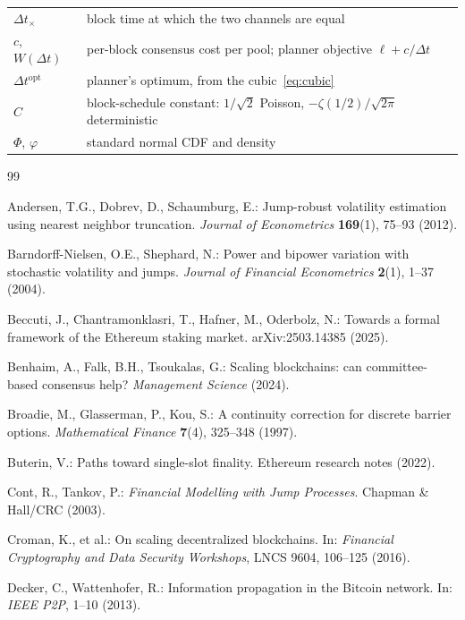 \documentclass[11pt]{article}
\theoremstyle{definition}
\theoremstyle{remark}
\newcommand{\dt}{\Delta t}
\newcommand{\1}{\mathbf{1}}
\begin{document}
\begin{center}
\begin{tabular}{ll}
$\dt_\times$ & block time at which the two channels are equal \\
$c$, $W(\dt)$ & per-block consensus cost per pool; planner objective $\ell + c/\dt$ \\
$\dt^{\mathrm{opt}}$ & planner's optimum, from the cubic~\eqref{eq:cubic} \\
$C$ & block-schedule constant: $1/\sqrt2$ Poisson, $-\zeta(1/2)/\sqrt{2\pi}$ deterministic \\
$\Phi$, $\varphi$ & standard normal CDF and density \\
\bottomrule
\end{tabular}
\end{center}

\begin{thebibliography}{99}

Andersen, T.G., Dobrev, D., Schaumburg, E.:
Jump-robust volatility estimation using nearest neighbor truncation.
\emph{Journal of Econometrics} \textbf{169}(1), 75--93 (2012).

Barndorff-Nielsen, O.E., Shephard, N.:
Power and bipower variation with stochastic volatility and jumps.
\emph{Journal of Financial Econometrics} \textbf{2}(1), 1--37 (2004).

Beccuti, J., Chantramonklasri, T., Hafner, M., Oderbolz, N.:
Towards a formal framework of the Ethereum staking market.
arXiv:2503.14385 (2025).

Benhaim, A., Falk, B.H., Tsoukalas, G.:
Scaling blockchains: can committee-based consensus help?
\emph{Management Science} (2024).

Broadie, M., Glasserman, P., Kou, S.:
A continuity correction for discrete barrier options.
\emph{Mathematical Finance} \textbf{7}(4), 325--348 (1997).

Buterin, V.: Paths toward single-slot finality. Ethereum research notes (2022).

Cont, R., Tankov, P.:
\emph{Financial Modelling with Jump Processes}. Chapman \& Hall/CRC (2003).

Croman, K., et al.: On scaling decentralized blockchains.
In: \emph{Financial Cryptography and Data Security Workshops}, LNCS 9604, 106--125 (2016).

Decker, C., Wattenhofer, R.: Information propagation in the Bitcoin network.
In: \emph{IEEE P2P}, 1--10 (2013).


\end{thebibliography}
\end{document}
